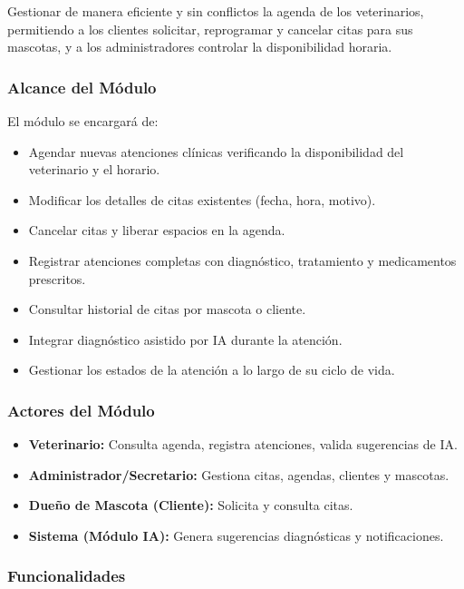 \documentclass[12pt,a4paper]{article}
\begin{document}
Gestionar de manera eficiente y sin conflictos la agenda de los veterinarios, permitiendo a los clientes solicitar, reprogramar y cancelar citas para sus mascotas, y a los administradores controlar la disponibilidad horaria.

\subsubsection{Alcance del Módulo}

El módulo se encargará de:
\begin{itemize}
    \item Agendar nuevas atenciones clínicas verificando la disponibilidad del veterinario y el horario.
    \item Modificar los detalles de citas existentes (fecha, hora, motivo).
    \item Cancelar citas y liberar espacios en la agenda.
    \item Registrar atenciones completas con diagnóstico, tratamiento y medicamentos prescritos.
    \item Consultar historial de citas por mascota o cliente.
    \item Integrar diagnóstico asistido por IA durante la atención.
    \item Gestionar los estados de la atención a lo largo de su ciclo de vida.
\end{itemize}

\subsubsection{Actores del Módulo}

\begin{itemize}
    \item \textbf{Veterinario:} Consulta agenda, registra atenciones, valida sugerencias de IA.
    \item \textbf{Administrador/Secretario:} Gestiona citas, agendas, clientes y mascotas.
    \item \textbf{Dueño de Mascota (Cliente):} Solicita y consulta citas.
    \item \textbf{Sistema (Módulo IA):} Genera sugerencias diagnósticas y notificaciones.
\end{itemize}

\subsubsection{Funcionalidades}
\end{document}
